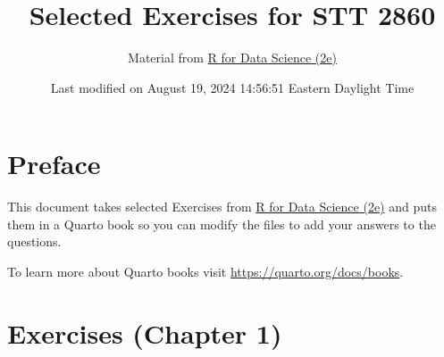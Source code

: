 \documentclass[
  letterpaper,
  DIV=11,
  numbers=noendperiod]{scrreprt}
\title{Selected Exercises for STT 2860}
\author{Material from \href{https://r4ds.hadley.nz/}{R for Data Science
(2e)}}
\date{Last modified on August 19, 2024 14:56:51 Eastern Daylight Time}
\renewcommand*\contentsname{Table of contents}
\newcommand\contentsname{Table of contents}
\begin{document}
\maketitle
\ifdefined\Shaded\renewenvironment{Shaded}{\begin{tcolorbox}[borderline west={3pt}{0pt}{shadecolor}, breakable, interior hidden, boxrule=0pt, enhanced, frame hidden, sharp corners]}{\end{tcolorbox}}\fi

\renewcommand*\contentsname{Table of contents}
{
\hypersetup{linkcolor=}
\setcounter{tocdepth}{2}
\tableofcontents
}

\hypertarget{preface}{%
\chapter*{Preface}\label{preface}}


This document takes selected Exercises from
\href{https://r4ds.hadley.nz/}{R for Data Science (2e)} and puts them in
a Quarto book so you can modify the files to add your answers to the
questions.

To learn more about Quarto books visit
\url{https://quarto.org/docs/books}.


\hypertarget{exercises-chapter-1}{%
\chapter{Exercises (Chapter 1)}\label{exercises-chapter-1}}
\end{document}
